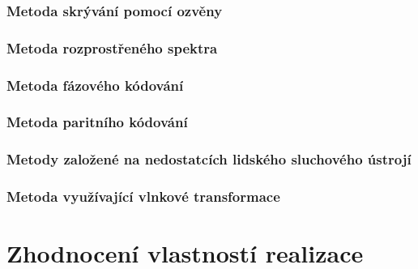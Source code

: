 \blindtext

\subsection*{Metoda skrývání pomocí ozvěny}
\label{sub:echo-hiding-implementation}

\blindtext

\subsection*{Metoda rozprostřeného spektra}
\label{sub:dsss-implementation}

\blindtext

\subsection*{Metoda fázového kódování}
\label{sub:phase-coding-implementation}


\blindtext

\subsection*{Metoda paritního kódování}
\label{sub:parity-coding-implementation}


\blindtext

\subsection*{Metody založené na nedostatcích lidského sluchového ústrojí}
\label{sub:has-implementation}


\blindtext

\subsection*{Metoda využívající vlnkové transformace}
\label{sub:wavelet-transform-implementation}


\blindtext


\chapter{Zhodnocení vlastností realizace}
\label{cha:method-evaluation}

